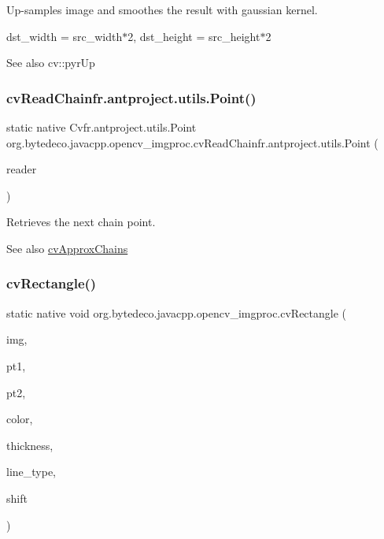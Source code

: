 Up-\/samples image and smoothes the result with gaussian kernel. 

dst\+\_\+width = src\+\_\+width$\ast$2, dst\+\_\+height = src\+\_\+height$\ast$2 \begin{DoxySeeAlso}{See also}
cv\+::pyr\+Up 
\end{DoxySeeAlso}
\mbox{\label{group__imgproc__c_ga60ca24d0d962737958150406351d91c7}} 
\subsubsection{\texorpdfstring{cv\+Read\+Chain\+fr.antproject.utils.Point()}{cvReadChainPoint()}}
{\footnotesize\ttfamily static native Cv\+fr.antproject.utils.Point org.\+bytedeco.\+javacpp.\+opencv\+\_\+imgproc.\+cv\+Read\+Chain\+fr.antproject.utils.Point (\begin{DoxyParamCaption}\item[{Cv\+Chain\+Pt\+Reader}]{reader }\end{DoxyParamCaption})\hspace{0.3cm}{\ttfamily [static]}}



Retrieves the next chain point. 

\begin{DoxySeeAlso}{See also}
\hyperlink{group__imgproc__c_ga5c874856009b84fc0c3a9533f957516c}{cv\+Approx\+Chains} 
\end{DoxySeeAlso}
\mbox{\label{group__imgproc__c_gabbde03cf95490cf3931d4949242e7d23}} 
\subsubsection{\texorpdfstring{cv\+Rectangle()}{cvRectangle()}}
{\footnotesize\ttfamily static native void org.\+bytedeco.\+javacpp.\+opencv\+\_\+imgproc.\+cv\+Rectangle (\begin{DoxyParamCaption}\item[{Cv\+Arr}]{img,  }\item[{@By\+Val Cv\+fr.antproject.utils.Point}]{pt1,  }\item[{@By\+Val Cv\+fr.antproject.utils.Point}]{pt2,  }\item[{@By\+Val Cv\+Scalar}]{color,  }\item[{int}]{thickness,  }\item[{int}]{line\+\_\+type,  }\item[{int}]{shift }\end{DoxyParamCaption})\hspace{0.3cm}{\ttfamily [static]}}




